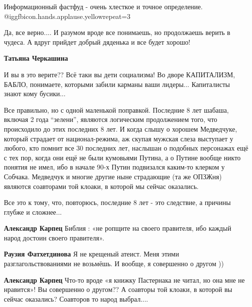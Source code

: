 
 
 
 
 
\zzSecCmt

\begin{itemize} %
Информационный фастфуд - очень хлесткое и точное определение.  @igg{fbicon.hands.applause.yellow}{repeat=3} 

Да, все верно.... И разумом вроде все понимаешь, но продолжаешь верить в
чудеса. А вдруг прийдет добрый дяденька и все будет хорошо!

\textbf{Татьяна Черкашина} 

И вы в это верите?? Всё таки вы дети социализма! Во дворе КАПИТАЛИЗМ, БАБЛО,
понимаете, которыми забили карманы ваши лидеры... Капиталисты знают кому
бусики...


Все правильно, но с одной маленькой поправкой. Последние 8 лет шабаша, включая
2 года \enquote{зелени}, являются логическим продолжением того, что происходило до этих
последних 8 лет. И когда слышу о хорошем Медведчуке, который страдает от
национал-режима, аж скупая мужская слеза выступает у любого, кто помнит все 30
последних лет, наслышан о подобных персонажах ещё с тех пор, когда они ещё не
были кумовьями Путина, а о Путине вообще никто понятия не имел, ибо в начале
90-х Путин подвизался каким-то клерком у Собчака. Медведчук и многие другие
ныне страдающие (та же ОПЗЖня) являются соавторами той клоаки, в которой мы
сейчас оказались.

Все это к тому, что, повторюсь, последние 8 лет - это следствие, а причины
глубже и сложнее...

\begin{itemize} %
\textbf{Александр Карпец} Библия : «не ропщите на своего правителя, ибо каждый народ достоин своего правителя».

\textbf{Раузия Фатхетдинова} Я не крещеный атеист. Меня этими разглагольствованиями не возьмёшь.
И вообще, я совершенно о другом ))

\textbf{Александр Карпец} Что-то вроде «я книжку Пастернака не читал, но она мне не нравится»! Вы совершенно о другом?? А соавторы той клоаки, в которой вы сейчас оказались? Соавторов то народ выбрал....


\end{itemize}
\end{itemize}
